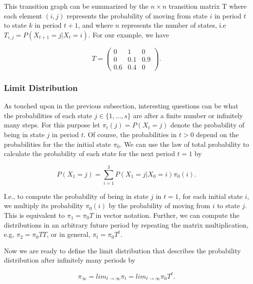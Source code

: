 \documentclass[12pt,english,a4paper,oneside]{article}
\theoremstyle{definition}
\theoremstyle{definition}
\theoremstyle{definition}
\theoremstyle{definition}
\theoremstyle{remark}
\begin{document}
\noindent
This transition graph can be summarized by the \(n \times n\) transition matrix T where each element \((i,j)\) represents the probability of moving from state \(i\) in period \(t\) to state \(k\) in period \(t+1\), and where \(n\) represents the number of states, i.e \(T_{i,j} = P(X_{t+1}=j | X_t = i)\). For our example, we have

\begin{equation}
\label{eq:transition-matrix}
T=
\begin{pmatrix}
0 & 1 & 0\\
0 & 0.1 & 0.9\\
0.6 & 0.4 & 0
\end{pmatrix}
.
\end{equation}

\hypertarget{limit-distribution}{%
\subsubsection{Limit Distribution}\label{limit-distribution}}

As touched upon in the previous subsection, interesting questions can be what the probabilities of each state \(j \in \{1, ..., s\}\) are after a finite number or infinitely many steps. For this purpose let \(\pi_t (j) = P(X_t = j)\) denote the probability of being in state \(j\) in period \(t\). Of course, the probabilities in \(t>0\) depend on the probabilities for the the initial state \(\pi_0\). We can use the law of total probability to calculate the probability of each state for the next period \(t=1\) by

\begin{equation}
\label{eq:tot-prob}
P(X_1 = j) = \sum_{i=1}^{3} P(X_1 = j | X_0 = i) \pi_0(i).
\end{equation}

\noindent
I.e., to compute the probability of being in state \(j\) in \(t=1\), for each initial state \(i\), we multiply its probability \(\pi_0(i)\) by the probability of moving from \(i\) to state \(j\). This is equivalent to \(\pi_1 = \pi_0 T\) in vector notation. Further, we can compute the distributions in an arbitrary future period by repeating the matrix multiplication, e.g, \(\pi_2 = \pi_0 T T\), or in general, \(\pi_t = \pi_0 T^t\).

Now we are ready to define the limit distribution that describes the probability distribution after infinitely many periods by

\begin{equation}
\label{eq:lim-dist}
\pi_{\infty} = lim_{t \rightarrow \infty} \pi_t = lim_{t \rightarrow \infty} \pi_0 T^t.
\end{equation}
\end{document}
